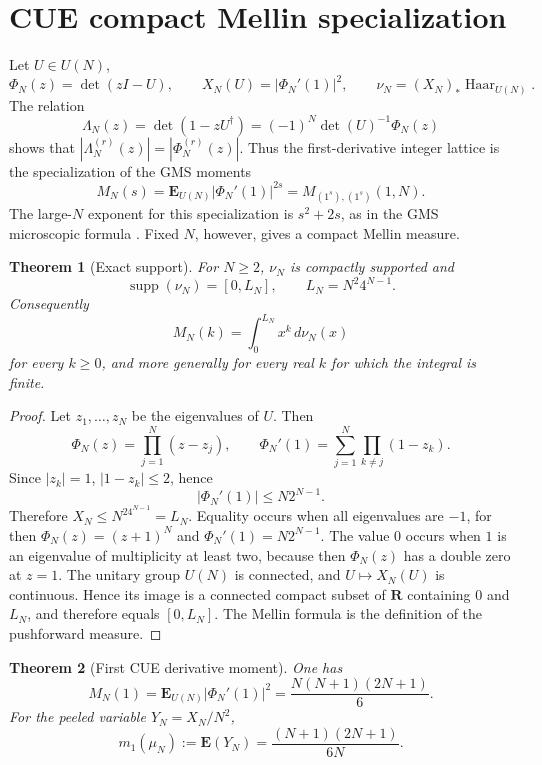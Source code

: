\documentclass[11pt]{article}
\newcommand{\R}{\mathbf R}
\newcommand{\supp}{\operatorname{supp}}
\newcommand{\Haar}{\operatorname{Haar}}
\theoremstyle{plain}
\newtheorem{theorem}{Theorem}[section]
\theoremstyle{definition}
\numberwithin{equation}{section}
\begin{document}
\section{CUE compact Mellin specialization}\label{sec:cue}

Let \(U\in U(N)\),
\[
 \Phi_N(z)=\det(zI-U),
 \qquad
 X_N(U)=|\Phi_N'(1)|^2,
 \qquad
 \nu_N=(X_N)_*\Haar_{U(N)}.
\]
The relation
\[
 \Lambda_N(z)=\det(1-zU^\dagger)=(-1)^N\det(U)^{-1}\Phi_N(z)
\]
shows that \(|\Lambda_N^{(r)}(z)|=|\Phi_N^{(r)}(z)|\).  Thus the first-derivative integer lattice is the specialization of the GMS moments
\[
 M_N(s)=\mathbf E_{U(N)}|\Phi_N'(1)|^{2s}=M_{(1^s),(1^s)}(1,N).
\]
The large-\(N\) exponent for this specialization is \(s^2+2s\), as in the GMS microscopic formula \cite{GMS}.  Fixed \(N\), however, gives a compact Mellin measure.

\begin{theorem}[Exact support]\label{thm:cue-support}
For \(N\ge2\), \(\nu_N\) is compactly supported and
\[
 \supp(\nu_N)=[0,L_N],
 \qquad
 L_N=N^2 4^{N-1}.
\]
Consequently
\[
 M_N(k)=\int_0^{L_N}x^k\,d\nu_N(x)
\]
for every \(k\ge0\), and more generally for every real \(k\) for which the integral is finite.
\end{theorem}

\begin{proof}
Let \(z_1,\ldots,z_N\) be the eigenvalues of \(U\).  Then
\[
 \Phi_N(z)=\prod_{j=1}^N(z-z_j),
 \qquad
 \Phi_N'(1)=\sum_{j=1}^N\prod_{k\ne j}(1-z_k).
\]
Since \(|z_k|=1\), \(|1-z_k|\le2\), hence
\[
 |\Phi_N'(1)|\le N2^{N-1}.
\]
Therefore \(X_N\le N^24^{N-1}=L_N\).  Equality occurs when all eigenvalues are \(-1\), for then \(\Phi_N(z)=(z+1)^N\) and \(\Phi_N'(1)=N2^{N-1}\).  The value \(0\) occurs when \(1\) is an eigenvalue of multiplicity at least two, because then \(\Phi_N(z)\) has a double zero at \(z=1\).  The unitary group \(U(N)\) is connected, and \(U\mapsto X_N(U)\) is continuous.  Hence its image is a connected compact subset of \(\R\) containing \(0\) and \(L_N\), and therefore equals \([0,L_N]\).  The Mellin formula is the definition of the pushforward measure.
\end{proof}

\begin{theorem}[First CUE derivative moment]\label{thm:cue-first-moment}
One has
\[
 M_N(1)=\mathbf E_{U(N)}|\Phi_N'(1)|^2=\frac{N(N+1)(2N+1)}6.
\]
For the peeled variable \(Y_N=X_N/N^2\),
\[
 m_1(\mu_N):=\mathbf E(Y_N)=\frac{(N+1)(2N+1)}{6N}.
\]
\end{theorem}
\end{document}
